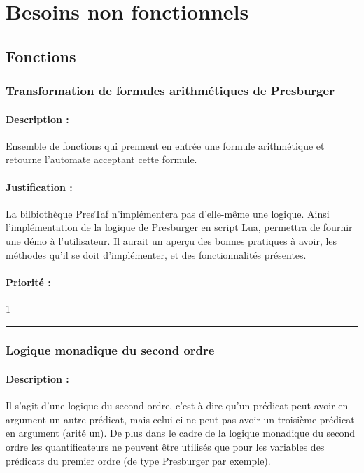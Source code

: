 \section{Besoins non fonctionnels}

\subsection{Fonctions}

\subsubsection{Transformation de formules arithmétiques de Presburger}

\paragraph{Description :} Ensemble de fonctions qui prennent en entrée une formule arithmétique et retourne l'automate acceptant cette formule.

\paragraph{Justification :} La bilbiothèque PresTaf n'implémentera pas d'elle-même une logique. Ainsi l'implémentation de la logique de Presburger en script Lua, permettra de fournir une démo à l'utilisateur. Il aurait un aperçu des bonnes pratiques à avoir, les méthodes qu'il se doit d'implémenter, et des fonctionnalités présentes.

\paragraph{Priorité :} 1\\

\rule{\linewidth}{1pt}

\subsubsection{Logique monadique du second ordre}

\paragraph{Description :} Il s'agit d'une logique du second ordre, c'est-à-dire qu'un prédicat peut avoir en argument un autre prédicat, mais celui-ci ne peut pas avoir un troisième prédicat en argument (arité un). De plus dans le cadre de la logique monadique du second ordre les quantificateurs ne peuvent être utilisés que pour les variables des prédicats du premier ordre (de type Presburger par exemple).

